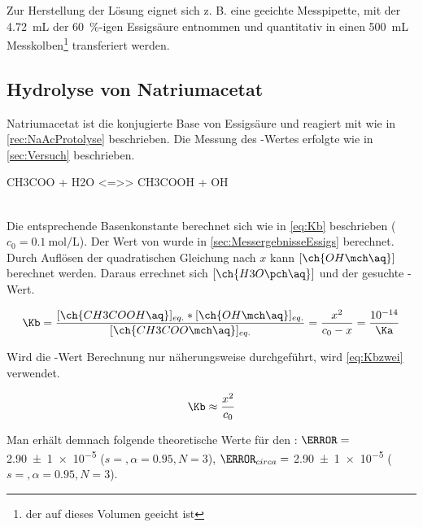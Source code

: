\documentclass{article}
\begin{document}
         Zur Herstellung der Lösung eignet sich z. B. eine geeichte Messpipette, mit der \SI[mode=text]{4.72}{\milli\liter} der \SI[mode=text]{60}{\percent}-igen Essigsäure entnommen und quantitativ in einen \SI[mode=text]{500}{\milli\liter} Messkolben\footnote{der auf dieses Volumen geeicht ist} transferiert werden.
     
    \subsection{Hydrolyse von Natriumacetat} \label{sec:HydrolyseNatrium}
     
       Natriumacetat ist die konjugierte Base von Essigsäure und reagiert mit  wie in \ref{rec:NaAcProtolyse} beschrieben. Die Messung des \pH-Wertes erfolgte wie in \ref{sec:Versuch} beschrieben.
       
       \begin{reaction}
         CH3COO\mch\aq{} + H2O <=>> CH3COOH\aq{} + OH\mch\aq \label{rec:NaAcProtolyse} \\
       \end{reaction} \\
       
       Die entsprechende Basenkonstante \Kb berechnet sich wie in \ref{eq:Kb} beschrieben ($c_{0} = \SI[mode=text]{0.1}{\mole\per\liter}$). Der Wert von \Ka wurde in \ref{sec:MessergebnisseEssigs} berechnet. Durch Auflösen der quadratischen Gleichung nach $x$ kann $[\ch{OH\mch\aq}]$ berechnet werden. Daraus errechnet sich $[\ch{H3O\pch\aq}]$ und der gesuchte \pH-Wert. 
       
       \begin{equation}
         \Kb = \frac{[\ch{CH3COOH\aq}]_{eq.} * [\ch{OH\mch\aq}]_{eq.}}{[\ch{CH3COO\mch\aq}]_{eq.}} = \frac{x^2}{c_{0}-x} = \frac{\num{e-14}}{\Ka} \label{eq:Kb}
       \end{equation}
       
       Wird die \pH-Wert Berechnung nur näherungsweise durchgeführt, wird \ref{eq:Kbzwei} verwendet.
       
       \begin{equation}
         \Kb \approx \frac{x^2}{c_{0}} \label{eq:Kbzwei}
       \end{equation}
       
       Man erhält demnach folgende theoretische Werte für den \pH: $\pH = $ \num[separate-uncertainty]{2.90 \pm 1 e-5} ($s = ,\alpha = 0.95, N = 3$), $\pH_{circa} = $ \num[separate-uncertainty]{2.90 \pm 1 e-5} ($s = ,\alpha = 0.95, N = 3$). \\
       
\end{document}
